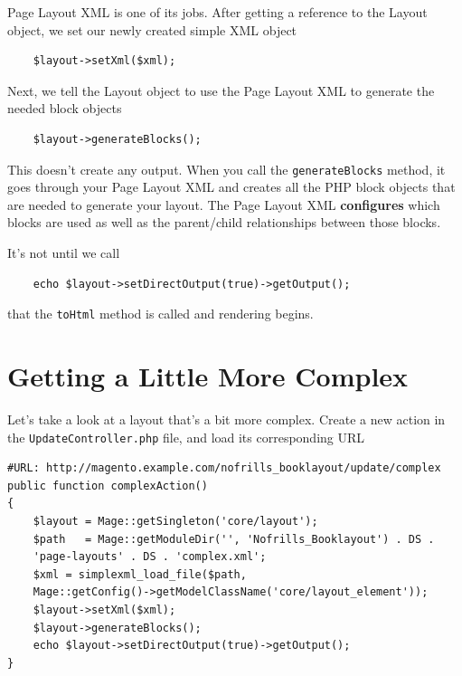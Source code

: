 \documentclass[oneside]{book}
\begin{document}
Page Layout XML is one of its jobs.  After getting a reference to the Layout object, we set our newly created simple XML object

\begin{lstlisting}
    $layout->setXml($xml);

\end{lstlisting}


Next, we tell the Layout object to use the Page Layout XML to generate the needed block objects 

\begin{lstlisting}
    $layout->generateBlocks();          

\end{lstlisting}


This doesn't create any output.  When you call the \footnotesize\texttt{generateBlocks} \normalsize  method, it goes through your Page Layout XML and creates all the PHP block objects that are needed to generate your layout.  The Page Layout XML \textbf{configures} which blocks are used as well as the parent/child relationships between those blocks. 

It's not until we call

\begin{lstlisting}
    echo $layout->setDirectOutput(true)->getOutput();           

\end{lstlisting}


that the \footnotesize\texttt{toHtml} \normalsize  method is called and rendering begins. 

\section{Getting a Little More Complex}

Let's take a look at a layout that's a bit more complex.  Create a new action in the \footnotesize\texttt{UpdateController.php} \normalsize  file, and load its corresponding URL

\begin{lstlisting}
#URL: http://magento.example.com/nofrills_booklayout/update/complex
public function complexAction()
{       
    $layout = Mage::getSingleton('core/layout');
    $path   = Mage::getModuleDir('', 'Nofrills_Booklayout') . DS . 
    'page-layouts' . DS . 'complex.xml';
    $xml = simplexml_load_file($path,
    Mage::getConfig()->getModelClassName('core/layout_element'));
    $layout->setXml($xml);
    $layout->generateBlocks();          
    echo $layout->setDirectOutput(true)->getOutput();                               
}

\end{lstlisting}
\end{document}
